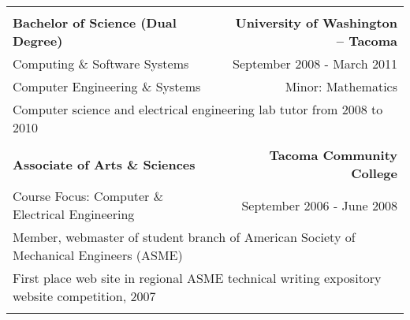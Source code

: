 \documentclass[letterpaper]{article}
\begin{document}
\begin{center}
\begin{tabular}{p{}r}
			\\
			\\
				\textbf{Bachelor of Science (Dual Degree)}			&
				\textbf{University of Washington -- Tacoma}
			\\
				Computing \& Software Systems						&
				September 2008 - March 2011
			\\
				Computer Engineering \& Systems						&
				Minor: Mathematics
			\\
				\multicolumn{2}{p{\textwidth}}{Computer science and electrical engineering lab tutor from 2008 to 2010}	
				
			\\
			\\
				\textbf{Associate of Arts \& Sciences}		    	&
				\textbf{Tacoma Community College}
			\\
				Course Focus: Computer \& Electrical Engineering	&
				September 2006 - June 2008
			\\
				\multicolumn{2}{p{\textwidth}}{Member, webmaster of student branch of American Society of Mechanical Engineers (ASME)}	
			\\
				\multicolumn{2}{p{\textwidth}}{First place web site in regional ASME technical writing expository website competition, 2007}				
			\\
			\\
		\end{tabular}
    \end{center}
    
\end{document}

